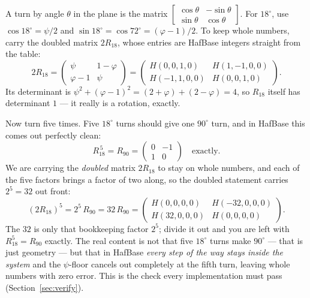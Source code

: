 \documentclass[11pt]{article}
\newcommand{\phigr}{\varphi}
\newcommand{\Hn}[4]{H(#1,#2,#3,#4)}
\begin{document}
A turn by angle $\theta$ in the plane is the matrix
$\left[\begin{smallmatrix}\cos\theta & -\sin\theta\\ \sin\theta & \cos\theta\end{smallmatrix}\right]$.
For $18^\circ$, use $\cos 18^\circ = \psi/2$ and $\sin 18^\circ = \cos 72^\circ = (\phigr-1)/2$. To keep
whole numbers, carry the doubled matrix $2R_{18}$, whose entries are HafBase integers straight from
the table:
\[
2R_{18} =
\begin{pmatrix} \psi & 1-\phigr \\ \phigr - 1 & \psi \end{pmatrix}
=
\begin{pmatrix} \Hn{0}{0}{1}{0} & \Hn{1}{-1}{0}{0} \\[2pt] \Hn{-1}{1}{0}{0} & \Hn{0}{0}{1}{0} \end{pmatrix}.
\]
Its determinant is $\psi^2 + (\phigr - 1)^2 = (2 + \phigr) + (2 - \phigr) = 4$, so $R_{18}$ itself has
determinant $1$ --- it really is a rotation, exactly.

Now turn five times. Five $18^\circ$ turns should give one $90^\circ$ turn, and in HafBase this comes
out perfectly clean:
\[
R_{18}^{\,5} = R_{90} = \begin{pmatrix} 0 & -1 \\ 1 & 0 \end{pmatrix} \quad\text{exactly.}
\]
We are carrying the \emph{doubled} matrix $2R_{18}$ to stay on whole numbers, and each of the five factors
brings a factor of two along, so the doubled statement carries $2^5 = 32$ out front:
\[
(2R_{18})^5 = 2^5\,R_{90} = 32\,R_{90}
= \begin{pmatrix} \Hn{0}{0}{0}{0} & \Hn{-32}{0}{0}{0} \\[3pt] \Hn{32}{0}{0}{0} & \Hn{0}{0}{0}{0} \end{pmatrix}.
\]
The $32$ is only that bookkeeping factor $2^5$; divide it out and you are left with $R_{18}^5 = R_{90}$
exactly. The real content is not that five $18^\circ$ turns make $90^\circ$ --- that is just geometry ---
but that in HafBase \emph{every step of the way stays inside the system} and the $\psi$-floor cancels out
completely at the fifth turn, leaving whole numbers with zero error. This is the check every
implementation must pass (Section~\ref{sec:verify}).
\end{document}
